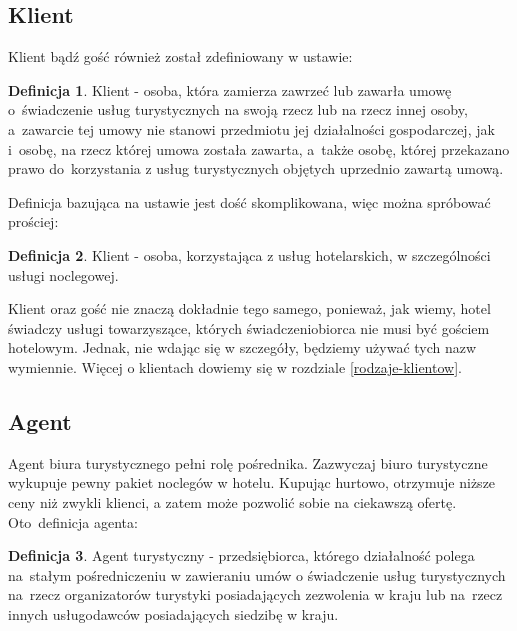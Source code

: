 \documentclass[a4paper,onecolumn,oneside,11pt,wide,floatssmall]{mwrep}
\theoremstyle{definition}
\newtheorem{defn}{Definicja}[section]
\theoremstyle{plain}%
\theoremstyle{remark}
\begin{document}
\subsection{Klient}

Klient bądź gość również został zdefiniowany w ustawie\cite{ust:tur}:

\begin{defn}{Klient}
- osoba, która zamierza zawrzeć lub zawarła umowę \mbox{o świadczenie} usług 
turystycznych na swoją rzecz lub na rzecz innej osoby, \mbox{a zawarcie} tej umowy 
nie stanowi przedmiotu jej działalności gospodarczej, jak \mbox{i osobę}, na rzecz 
której umowa została zawarta, \mbox{a także} osobę, której przekazano prawo \mbox{do 
korzystania} z usług turystycznych objętych uprzednio zawartą umową.

\end{defn}

Definicja bazująca na ustawie jest dość skomplikowana, więc można spróbować 
prościej:

\begin{defn}{Klient}
- osoba, korzystająca z usług hotelarskich, w szczególności usługi noclegowej.

\end{defn}

Klient oraz gość nie znaczą dokładnie tego samego, ponieważ, jak wiemy, 
hotel świadczy usługi towarzyszące, których świadczeniobiorca nie musi być 
gościem hotelowym. Jednak, nie wdając się w szczegóły, 
będziemy używać tych nazw wymiennie. Więcej o klientach dowiemy się w rozdziale
\ref{rodzaje-klientow}.

\subsection{Agent}
Agent biura turystycznego pełni rolę pośrednika. Zazwyczaj biuro turystyczne 
wykupuje pewny pakiet noclegów w hotelu. Kupując hurtowo, otrzymuje niższe 
ceny niż zwykli klienci, a zatem może pozwolić sobie na ciekawszą ofertę. 
\mbox{Oto definicja} agenta\cite{ust:tur}:

\begin{defn}{Agent turystyczny}
- przedsiębiorca, którego działalność polega \mbox{na stałym} pośredniczeniu w 
zawieraniu umów o świadczenie usług turystycznych \mbox{na rzecz} organizatorów 
turystyki posiadających zezwolenia w kraju lub \mbox{na rzecz} innych usługodawców 
posiadających siedzibę w kraju.
\end{defn}
\end{document}
